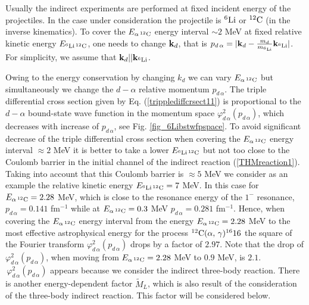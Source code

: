 \documentclass[prl,unsortedaddress,groupedaddress,twocolumn,amsmath,amsfonts,amssymb,showpacs,floatfix,nofootinbib]{revtex4}
\begin{document}
Usually the indirect experiments are performed at fixed incident energy of the projectiles. In the case under consideration the projectile is ${}^{6}{\rm Li}$ or ${}^{12}{\rm C}$ (in the inverse kinematics). To cover the $E_{\alpha\,{}^{12}{\rm C}}$ energy interval $\sim 2$ MeV at fixed relative kinetic energy $E_{^{6}{\rm Li}\,{}^{12}{\rm C}}$, 
one needs to change ${\rm {\bf k}}_{d}$, that is 
$p_{d\,\alpha} = |{\rm {\bf k}}_{d} - \frac{m_{d}}{m_{{}^{6}{\rm Li}}}{\rm {\bf k}}_{{}^{6}{\rm Li}}| $. For simplicity, we assume that ${\rm {\bf k}}_{d} || {\rm {\bf k}}_{{}^{6}{\rm Li}}$. 

Owing to the energy conservation by changing $k_{d}$ we can vary $E_{\alpha\,{}^{12}{\rm C}}$ but simultaneously we change the $d-\alpha$ relative momentum $p_{d\,\alpha}$. The triple
differential cross section given by Eq. (\ref{tripplediffcrsect11}) is proportional to the $d-\alpha$ bound-state wave function in the momentum space $\varphi_{d\,\alpha}^{2}(p_{d\,\alpha})$, which 
decreases with increase of $p_{d\,\alpha}$, see Fig. \ref{fig_6Libstwfpspace}.
 To avoid significant decrease of the triple differential cross section when covering the $E_{\alpha\,{}^{12}{\rm C}}$ energy interval $\approx 2$ MeV it is better to take a lower $E_{^{6}{\rm Li}\,{}^{12}{\rm C}}$ 
but not too close to the Coulomb barrier in the initial channel of the indirect reaction (\ref{THMreaction1}). Taking into account that this Coulomb barrier is $\approx 5$ MeV we consider as an example the relative kinetic energy $E_{^{6}{\rm Li}\,{}^{12}{\rm C}}=7$ MeV. 
In this case for $E_{\alpha\,{}^{12}{\rm C}}=2.28$ MeV, which is close to the resonance energy of the $1^{-}$ resonance, $p_{d\,\alpha}= 0.141$ fm${}^{-1}$ while at $E_{\alpha\,{}^{12}{\rm C}}=0.3$ MeV  $p_{d\,\alpha}= 0.281$ fm${}^{-1}$. Hence, when covering the $E_{\alpha\,{}^{12}{\rm C}}$ energy interval from the energy  $E_{\alpha\,{}^{12}{\rm C}}=2.28$ MeV to the most effective astrophysical energy for the process 
${}^{12}{\rm C}(\alpha,\,\gamma){}^{16}{\rm 16}$  the square of the Fourier transform $\varphi_{d\,\alpha}^{2}(p_{d\,\alpha})$ drops by a factor of $2.97$. Note that the drop of $\varphi_{d\,\alpha}^{2}(p_{d\,\alpha})$, when moving from $E_{\alpha\,{}^{12}{\rm C}}=2.28$ MeV to $0.9$ MeV, is $2.1$. $\,\varphi_{d\,\alpha}^{2}(p_{d\,\alpha})$ appears because we consider the indirect three-body reaction. There is another energy-dependent factor ${\tilde M}_{L}$, which is also result of the consideration of the three-body indirect reaction. This factor will be considered below.
\end{document}

